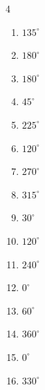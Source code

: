\begin{multicols}{4}
\begin{enumerate}
  \item $\displaystyle 135^{\circ}$

  \item $\displaystyle 180^{\circ}$
        \phantom{$\displaystyle =\pi$}

  \item $\displaystyle 180^{\circ}$
        \phantom{$\displaystyle =\pi$}

  \item $\displaystyle 45^{\circ}$

  \item $\displaystyle 225^{\circ}$

  \item $\displaystyle 120^{\circ}$

  \item $\displaystyle 270^{\circ}$

  \item $\displaystyle 315^{\circ}$

  \item $\displaystyle 30^{\circ}$

  \item $\displaystyle 120^{\circ}$

  \item $\displaystyle 240^{\circ}$

  \item $\displaystyle 0^{\circ}$
        \phantom{$\displaystyle =0$}

  \item $\displaystyle 60^{\circ}$

  \item $\displaystyle 360^{\circ}$
        \phantom{$\displaystyle =2\pi$}

  \item $\displaystyle 0^{\circ}$
        \phantom{$\displaystyle =0$}

\columnbreak %

  \item $\displaystyle 330^{\circ}$


\end{enumerate}
\end{multicols}
